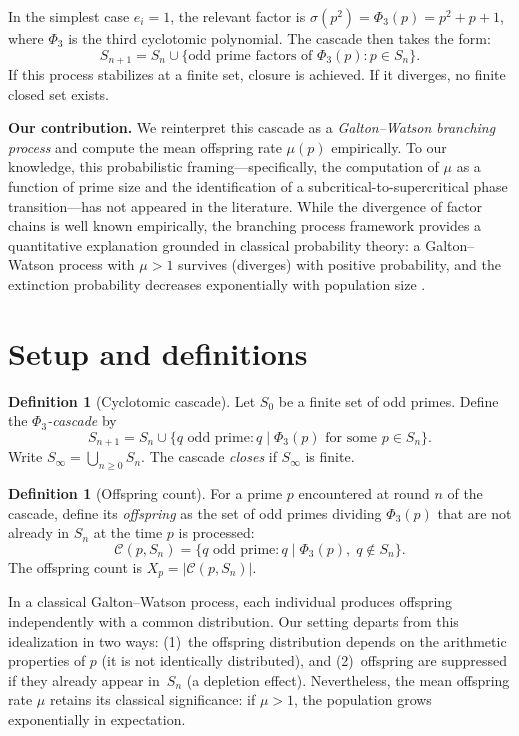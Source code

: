 \documentclass[11pt]{article}
\theoremstyle{definition}
\newtheorem{definition}[theorem]{Definition}
\theoremstyle{remark}
\newcommand{\Phi}{\varPhi}
\begin{document}
In the simplest case $e_i = 1$, the relevant factor is $\sigma(p^2) = \Phi_3(p) = p^2 + p + 1$, where $\Phi_3$ is the third cyclotomic polynomial. The cascade then takes the form:
\[
S_{n+1} = S_n \cup \bigl\{\text{odd prime factors of } \Phi_3(p) : p \in S_n \bigr\}.
\]
If this process stabilizes at a finite set, closure is achieved. If it diverges, no finite closed set exists.

\medskip

\noindent\textbf{Our contribution.} We reinterpret this cascade as a \emph{Galton--Watson branching process} and compute the mean offspring rate $\mu(p)$ empirically. To our knowledge, this probabilistic framing---specifically, the computation of $\mu$ as a function of prime size and the identification of a subcritical-to-supercritical phase transition---has not appeared in the literature. While the divergence of factor chains is well known empirically, the branching process framework provides a quantitative explanation grounded in classical probability theory: a Galton--Watson process with $\mu > 1$ survives (diverges) with positive probability, and the extinction probability decreases exponentially with population size \cite{AthreyaNey1972}.

\section{Setup and definitions}

\begin{definition}[Cyclotomic cascade]
Let $S_0$ be a finite set of odd primes. Define the \emph{$\Phi_3$-cascade} by
\[
S_{n+1} = S_n \cup \bigl\{q \text{ odd prime} : q \mid \Phi_3(p) \text{ for some } p \in S_n\bigr\}.
\]
Write $S_\infty = \bigcup_{n \geq 0} S_n$. The cascade \emph{closes} if $S_\infty$ is finite.
\end{definition}

\begin{definition}[Offspring count]
For a prime $p$ encountered at round $n$ of the cascade, define its \emph{offspring} as the set of odd primes dividing $\Phi_3(p)$ that are not already in $S_n$ at the time $p$ is processed:
\[
\mathcal{C}(p, S_n) = \bigl\{q \text{ odd prime} : q \mid \Phi_3(p),\; q \notin S_n \bigr\}.
\]
The offspring count is $X_p = |\mathcal{C}(p, S_n)|$.
\end{definition}

In a classical Galton--Watson process, each individual produces offspring independently with a common distribution. Our setting departs from this idealization in two ways: (1)~the offspring distribution depends on the arithmetic properties of $p$ (it is not identically distributed), and (2)~offspring are suppressed if they already appear in~$S_n$ (a depletion effect). Nevertheless, the mean offspring rate $\mu$ retains its classical significance: if $\mu > 1$, the population grows exponentially in expectation.
\end{document}
